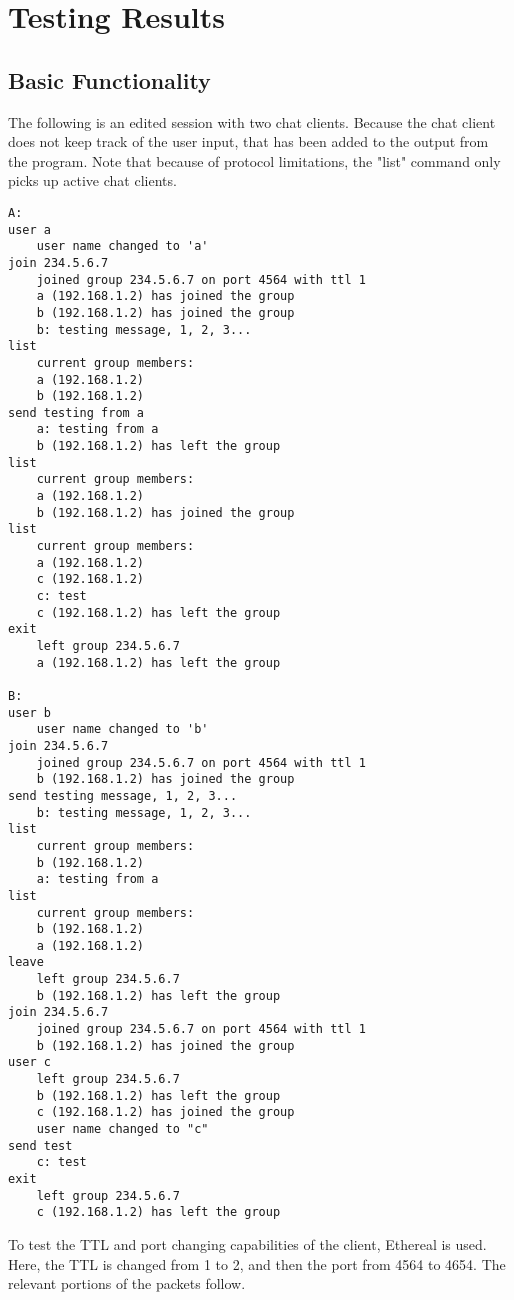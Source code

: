 \documentclass[11pt]{report}
\begin{document}
\section{Testing Results}

\subsection{Basic Functionality}

The following is an edited session with two chat clients. Because the chat client does not keep track of the user input, that has been added to the output from the program. Note that because of protocol limitations, the "list" command only picks up active chat clients.

\begin{verbatim}
A:
user a
	user name changed to 'a'
join 234.5.6.7
	joined group 234.5.6.7 on port 4564 with ttl 1
	a (192.168.1.2) has joined the group
	b (192.168.1.2) has joined the group
	b: testing message, 1, 2, 3...
list
	current group members:
	a (192.168.1.2)
	b (192.168.1.2)
send testing from a
	a: testing from a
	b (192.168.1.2) has left the group
list
	current group members:
	a (192.168.1.2)
	b (192.168.1.2) has joined the group
list
	current group members:
	a (192.168.1.2)
	c (192.168.1.2)
	c: test
	c (192.168.1.2) has left the group
exit
	left group 234.5.6.7
	a (192.168.1.2) has left the group
	
B:
user b
	user name changed to 'b'
join 234.5.6.7
	joined group 234.5.6.7 on port 4564 with ttl 1
	b (192.168.1.2) has joined the group
send testing message, 1, 2, 3...
	b: testing message, 1, 2, 3...
list
	current group members:
	b (192.168.1.2)
	a: testing from a
list
	current group members:
	b (192.168.1.2)
	a (192.168.1.2)
leave
	left group 234.5.6.7
	b (192.168.1.2) has left the group
join 234.5.6.7
	joined group 234.5.6.7 on port 4564 with ttl 1
	b (192.168.1.2) has joined the group
user c
	left group 234.5.6.7
	b (192.168.1.2) has left the group
	c (192.168.1.2) has joined the group
	user name changed to "c"
send test
	c: test
exit
	left group 234.5.6.7
	c (192.168.1.2) has left the group
\end{verbatim}

To test the TTL and port changing capabilities of the client, Ethereal is used. Here, the TTL is changed from 1 to 2, and then the port from 4564 to 4654. The relevant portions of the packets follow.
\end{document}
